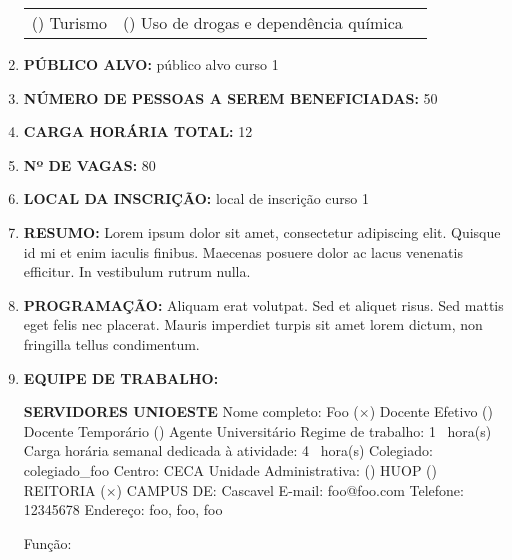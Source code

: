 \documentclass[12pt,a4paper,oneside]{article}%
\begin{document}
\begin{enumerate}
{\begin{tabularx}{\linewidth}{X|X|X}
(\phantom{$\times$}) Turismo &(\phantom{$\times$}) Uso de drogas e dependência química &\\%
\end{tabularx}%
}%
\item%
\textbf{PÚBLICO ALVO: }%
público alvo curso 1%
\item%
\textbf{NÚMERO DE PESSOAS A SEREM BENEFICIADAS: }%
50%
\item%
\textbf{CARGA HORÁRIA TOTAL: }%
12%
\item%
\textbf{Nº DE VAGAS: }%
80%
\item%
\textbf{LOCAL DA INSCRIÇÃO: }%
local de inscrição curso 1%
\item%
\textbf{RESUMO: }%
\newline%
Lorem ipsum dolor sit amet, consectetur adipiscing elit. Quisque id mi et enim iaculis finibus. Maecenas posuere dolor ac lacus venenatis efficitur. In vestibulum rutrum nulla.%
\item%
\textbf{PROGRAMAÇÃO: }%
\newline%
Aliquam erat volutpat. Sed et aliquet risus. Sed mattis eget felis nec placerat. Mauris imperdiet turpis sit amet lorem dictum, non fringilla tellus condimentum.%
\item%
\textbf{EQUIPE DE TRABALHO: }%
\newline%
\begin{mdframed}[innertopmargin=5pt, innerleftmargin=3pt, innerrightmargin=3pt]%
\textbf{SERVIDORES UNIOESTE }%
\newline%
Nome completo: %
Foo%
\newline%
($\times$) Docente Efetivo %
(\phantom{$\times$}) Docente Temporário %
(\phantom{$\times$}) Agente Universitário %
\newline%
Regime de trabalho: %
1%
\ hora(s) \hfill%
Carga horária semanal dedicada à atividade: %
4%
\ hora(s) \hfill%
\newline%
Colegiado: %
colegiado\_foo%
\hfill%
Centro: %
CECA%
\newline%
Unidade Administrativa: %
(\phantom{$\times$}) HUOP %
(\phantom{$\times$}) REITORIA %
($\times$) CAMPUS DE: Cascavel%
\newline%
E-mail: %
foo@foo.com%
\newline%
Telefone: %
12345678%
\newline%
Endereço: %
foo, foo, foo%
\newline%
\begin{mdframed}[innertopmargin=5pt, innerleftmargin=3pt, innerrightmargin=3pt]%
Função: %
\newline%

\end{mdframed}
\end{mdframed}
\end{enumerate}
\end{document}
